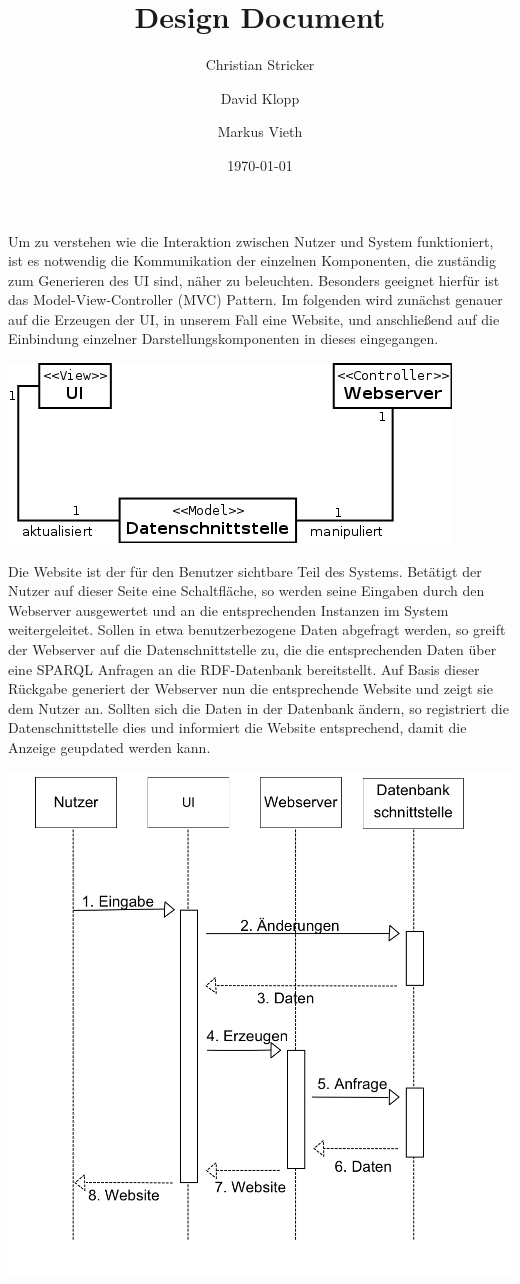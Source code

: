 \documentclass{book}
\title{Design Document}
\author{Christian Stricker \and David Klopp \and Markus Vieth}
\date{\today}
\begin{document}
Um zu verstehen wie die Interaktion zwischen Nutzer und System funktioniert, ist es notwendig die Kommunikation der einzelnen Komponenten, die zuständig zum Generieren des UI sind, näher zu beleuchten. 
Besonders geeignet hierfür ist das Model-View-Controller (MVC) Pattern. 
Im folgenden wird zunächst genauer auf die Erzeugen der UI, in unserem Fall eine Website, und anschließend auf die Einbindung einzelner Darstellungskomponenten in dieses eingegangen. \\

\begin{center}
\includegraphics[scale=0.6]{../Grafik/Diagramm/Pattern/MVC/Website/Kontextdiagramm.png}
\end{center}

Die Website ist der für den Benutzer sichtbare Teil des Systems. Betätigt der Nutzer auf dieser Seite eine Schaltfläche, so werden seine Eingaben durch den Webserver ausgewertet und an die entsprechenden Instanzen im System weitergeleitet. Sollen in etwa benutzerbezogene Daten abgefragt werden, so greift der Webserver auf die Datenschnittstelle zu, die die entsprechenden Daten über eine SPARQL Anfragen an die RDF-Datenbank bereitstellt. Auf Basis dieser Rückgabe generiert der Webserver nun die entsprechende Website und  zeigt sie dem Nutzer an.
Sollten sich die Daten in der Datenbank ändern, so registriert die Datenschnittstelle dies und informiert die Website entsprechend, damit die Anzeige geupdated werden kann.

\begin{center}
\includegraphics[width=1.0\linewidth]{../Grafik/Diagramm/Pattern/MVC/Website/Sequenzdiagramm.png}
\end{center}
\end{document}
